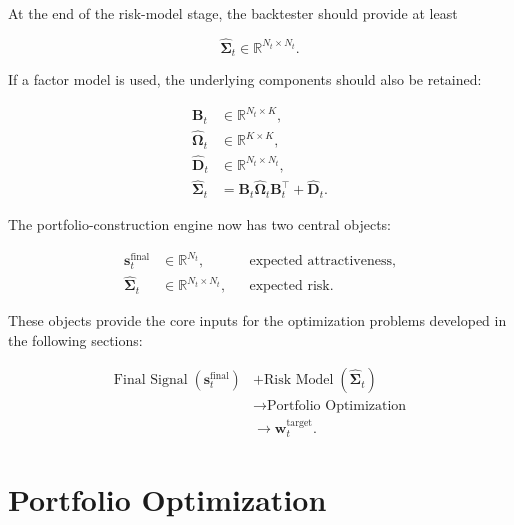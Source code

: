 \documentclass[11pt,a4paper]{article}
\begin{document}
At the end of the risk-model stage, the backtester should provide at least

\begin{equation}
\boxed{
\widehat{\boldsymbol{\Sigma}}_t
\in
\mathbb{R}^{N_t\times N_t}.
}
\end{equation}

If a factor model is used, the underlying components should also be retained:

\begin{equation}
\boxed{
\begin{aligned}
\mathbf{B}_t
&\in
\mathbb{R}^{N_t\times K},
\\
\widehat{\boldsymbol{\Omega}}_t
&\in
\mathbb{R}^{K\times K},
\\
\widehat{\mathbf{D}}_t
&\in
\mathbb{R}^{N_t\times N_t},
\\
\widehat{\boldsymbol{\Sigma}}_t
&=
\mathbf{B}_t
\widehat{\boldsymbol{\Omega}}_t
\mathbf{B}_t^\top
+
\widehat{\mathbf{D}}_t.
\end{aligned}
}
\end{equation}

The portfolio-construction engine now has two central objects:

\begin{equation}
\boxed{
\begin{aligned}
\mathbf{s}_t^{\mathrm{final}}
&\in
\mathbb{R}^{N_t},
&&
\text{expected attractiveness},
\\
\widehat{\boldsymbol{\Sigma}}_t
&\in
\mathbb{R}^{N_t\times N_t},
&&
\text{expected risk}.
\end{aligned}
}
\end{equation}

These objects provide the core inputs for the optimization problems developed in
the following sections:

\begin{equation}
\boxed{
\begin{aligned}
\text{Final Signal}
\;(\mathbf{s}_t^{\mathrm{final}})
&+
\text{Risk Model}
\;(\widehat{\boldsymbol{\Sigma}}_t)
\\
&\rightarrow
\text{Portfolio Optimization}
\\
&\rightarrow
\mathbf{w}_t^{\mathrm{target}}.
\end{aligned}
}
\end{equation}

\section{Portfolio Optimization}
\label{sec:portfolio_optimization}
\end{document}
